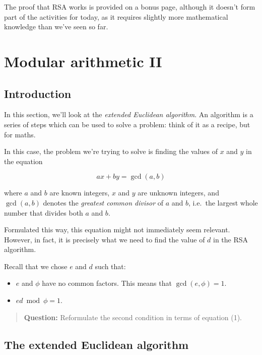 \documentclass[
  letterpaper,
  DIV=11,
  numbers=noendperiod]{scrreprt}
\providecommand{\tightlist}{%
  \setlength{\itemsep}{0pt}\setlength{\parskip}{0pt}}\usepackage{longtable,booktabs,array}
\begin{document}
The proof that RSA works is provided on a bonus page, although it
doesn't form part of the activities for today, as it requires slightly
more mathematical knowledge than we've seen so far.

\hypertarget{modular-arithmetic-ii}{%
\chapter{Modular arithmetic II}\label{modular-arithmetic-ii}}

\hypertarget{introduction-4}{%
\section{Introduction}\label{introduction-4}}

In this section, we'll look at the \emph{extended Euclidean algorithm}.
An algorithm is a series of steps which can be used to solve a problem:
think of it as a recipe, but for maths.

In this case, the problem we're trying to solve is finding the values of
\(x\) and \(y\) in the equation

\[ax + by = \gcd(a, b) \tag{1}\]

where \(a\) and \(b\) are known integers, \(x\) and \(y\) are unknown
integers, and \(\gcd(a, b)\) denotes the \emph{greatest common divisor}
of \(a\) and \(b\), i.e.~the largest whole number that divides both
\(a\) and \(b\).

Formulated this way, this equation might not immediately seem relevant.
However, in fact, it is precisely what we need to find the value of
\(d\) in the RSA algorithm.

Recall that we chose \(e\) and \(d\) such that:

\begin{itemize}
\tightlist
\item
  \(e\) and \(\phi\) have no common factors. This means that
  \(\gcd(e, \phi) = 1\).
\item
  \(ed \bmod \phi = 1\).
\end{itemize}

\begin{quote}
\textbf{Question:} Reformulate the second condition in terms of equation
(1).
\end{quote}

\hypertarget{the-extended-euclidean-algorithm}{%
\section{The extended Euclidean
algorithm}\label{the-extended-euclidean-algorithm}}
\end{document}
